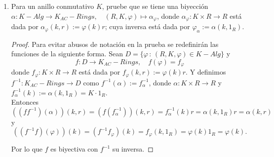 \documentclass{article}
\newcommand{\lrprth}[1]{
    \left(#1\right)
}
\newcommand{\ringcenter}[1]{
    C\lrprth{#1}
}
\theoremstyle{definition}
\theoremstyle{plain}
\theoremstyle{plain}
\theoremstyle{definition}
\theoremstyle{definition}
\theoremstyle{definition}
\theoremstyle{definition}
\theoremstyle{definition}
\theoremstyle{definition}
\begin{document}
\begin{enumerate}[label=\textbf{Ej \arabic*.}]
\begin{proof}
Finalmente, de la quinta condición de ser acción a izquierda, se deduce que $im\lrprth{\varphi_{\alpha}}\subseteq\ringcenter{R}$. En efecto, si $k \in K$ y $r \in R$, entonces
\begin{align*}
\varphi_{\alpha}\lrprth{k}r=\lrprth{k \cdot 1_{R}}r\\
=k \cdot\lrprth{1_{R}r}\\
=k \cdot\lrprth{r1_{R}}\\
=r \cdot\lrprth{k1_{R}}\\
=r\varphi_{\alpha}\lrprth{k}
\end{align*}
Por lo que $im\lrprth{\varphi_{\alpha}}\subseteq \ringcenter{R}$.
\end{proof}
    \item 
Para un anillo conmutativo $K$, pruebe que se tiene una biyección \\
$\alpha:K-Alg\longrightarrow K_{AC}-Rings,\quad  (R,K,\varphi)\longmapsto \alpha_{\varphi}$, donde 
$\alpha_\varphi:K\times R\to R$ está dada por $\alpha_\varphi(k,r):=\varphi(k)r$; cuya inversa está dada por
 $\varphi_\alpha:=\alpha(k,1_R).$
 
 \begin{proof}
Para evitar abusos de notación en la prueba se redefinirán las funciones de la siguiente forma. Sean 
$D=\{\varphi \,:\, (R,K,\varphi)\in  K-Alg\}$ y 
\[f:D\longrightarrow K_{AC}-Rings, \quad f(\varphi)=f_\varphi\]
donde $f_\varphi:K\times R\to R$ está dada por $f_\varphi(k,r):=\varphi(k)r$. Y definimos \\
$f^{-1}:K_{AC}-Rings\longrightarrow D$ como $f^{-1}(\alpha):=f^{-1}_\alpha$, donde
 $\alpha:K\times R\to R$ y $f^{-1}_\alpha(k):=\alpha (k,1_R)=K\cdot 1_R$.\\
 
Entonces \[\left((ff^{-1})(\alpha)\right)(k,r)=\left(f(f^{-1}_\alpha)\right)(k,r)=f^{-1}_\alpha(k)r=\alpha(k,1_R)r=\alpha(k,r)\]
y
\[\left((f^{-1}f)(\varphi)\right)(k)=\left(f^{-1}f_\varphi\right)(k)=f_\varphi(k,1_R)=\varphi(k)1_R=\varphi(k).\]

Por lo que $f$ es biyectiva con $f^{-1}$ su inversa.
\end{proof}


\end{enumerate}
\end{document}
